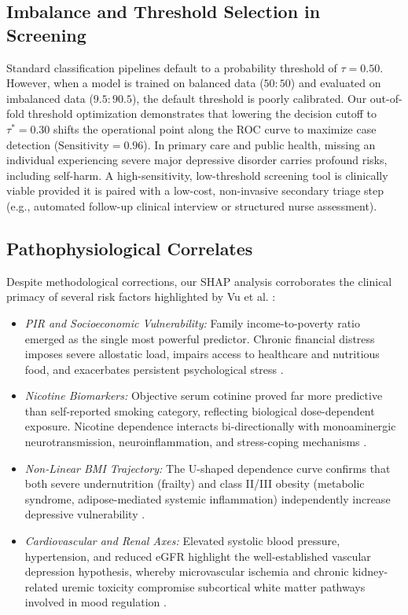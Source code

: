 \documentclass[conference]{IEEEtran}
\begin{document}
\subsection{Imbalance and Threshold Selection in Screening}
Standard classification pipelines default to a probability threshold of $\tau = 0.50$. However, when a model is trained on balanced data ($50:50$) and evaluated on imbalanced data ($9.5:90.5$), the default threshold is poorly calibrated. Our out-of-fold threshold optimization demonstrates that lowering the decision cutoff to $\tau^* = 0.30$ shifts the operational point along the ROC curve to maximize case detection ($\text{Sensitivity} = 0.96$). In primary care and public health, missing an individual experiencing severe major depressive disorder carries profound risks, including self-harm. A high-sensitivity, low-threshold screening tool is clinically viable provided it is paired with a low-cost, non-invasive secondary triage step (e.g., automated follow-up clinical interview or structured nurse assessment).

\subsection{Pathophysiological Correlates}
Despite methodological corrections, our SHAP analysis corroborates the clinical primacy of several risk factors highlighted by Vu et al. \cite{vu2025}:
\begin{itemize}
    \item \textit{PIR and Socioeconomic Vulnerability:} Family income-to-poverty ratio emerged as the single most powerful predictor. Chronic financial distress imposes severe allostatic load, impairs access to healthcare and nutritious food, and exacerbates persistent psychological stress \cite{berk2013}.
    \item \textit{Nicotine Biomarkers:} Objective serum cotinine proved far more predictive than self-reported smoking category, reflecting biological dose-dependent exposure. Nicotine dependence interacts bi-directionally with monoaminergic neurotransmission, neuroinflammation, and stress-coping mechanisms \cite{vu2025}.
    \item \textit{Non-Linear BMI Trajectory:} The U-shaped dependence curve confirms that both severe undernutrition (frailty) and class II/III obesity (metabolic syndrome, adipose-mediated systemic inflammation) independently increase depressive vulnerability \cite{badillo2022}.
    \item \textit{Cardiovascular and Renal Axes:} Elevated systolic blood pressure, hypertension, and reduced eGFR highlight the well-established vascular depression hypothesis, whereby microvascular ischemia and chronic kidney-related uremic toxicity compromise subcortical white matter pathways involved in mood regulation \cite{zhang2023}.
\end{itemize}
\end{document}
